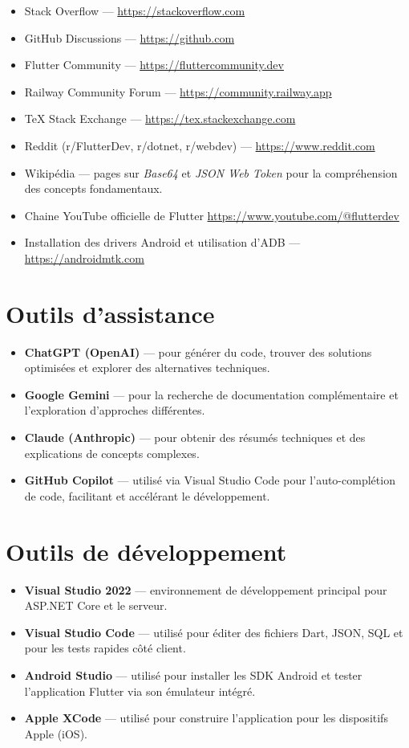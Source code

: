 \documentclass[12pt]{report}
\begin{document}
\begin{itemize}
	\item Stack Overflow — \url{https://stackoverflow.com}
	\item GitHub Discussions — \url{https://github.com}
	\item Flutter Community — \url{https://fluttercommunity.dev}
	\item Railway Community Forum — \url{https://community.railway.app}
	\item TeX Stack Exchange — \url{https://tex.stackexchange.com}
	\item Reddit (r/FlutterDev, r/dotnet, r/webdev) — \url{https://www.reddit.com}
	\item Wikipédia — pages sur \textit{Base64} et \textit{JSON Web Token} pour la compréhension des concepts fondamentaux.
	\item Chaine YouTube officielle de Flutter \url{https://www.youtube.com/@flutterdev}
	\item Installation des drivers Android et utilisation d’ADB — \url{https://androidmtk.com}
\end{itemize}

\section{Outils d’assistance}

\begin{itemize}
	\item \textbf{ChatGPT (OpenAI)} — pour générer du code, trouver des solutions optimisées et explorer des alternatives techniques.
	\item \textbf{Google Gemini} — pour la recherche de documentation complémentaire et l’exploration d’approches différentes.
	\item \textbf{Claude (Anthropic)} — pour obtenir des résumés techniques et des explications de concepts complexes.
	\item \textbf{GitHub Copilot} — utilisé via Visual Studio Code pour l’auto-complétion de code, facilitant et accélérant le développement.
\end{itemize}


\section{Outils de développement}

\begin{itemize}
	\item \textbf{Visual Studio 2022} — environnement de développement principal pour ASP.NET Core et le serveur.
	\item \textbf{Visual Studio Code} — utilisé pour éditer des fichiers Dart, JSON, SQL et pour les tests rapides côté client.
	\item \textbf{Android Studio} — utilisé pour installer les SDK Android et tester l’application Flutter via son émulateur intégré.
	\item \textbf{Apple XCode} — utilisé pour construire l'application pour les dispositifs Apple (iOS).
\end{itemize}
\end{document}
